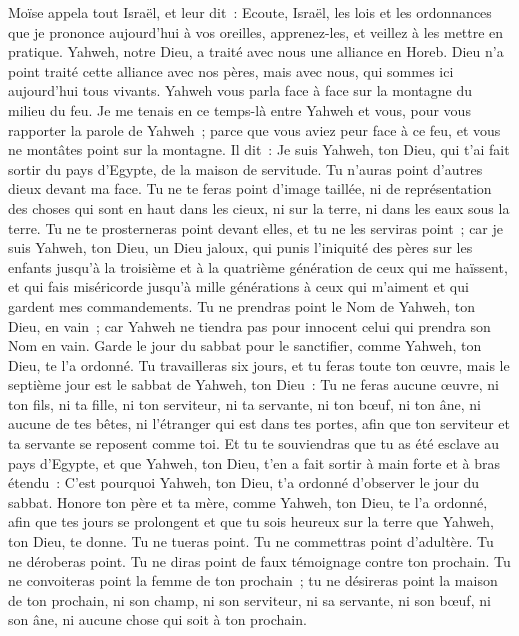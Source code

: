 \begin{multicols}{2}
\VerseOne{}Moïse appela tout Israël, et leur dit~: Ecoute, Israël, les lois et les ordonnances que je prononce aujourd'hui à vos oreilles, apprenez-les, et veillez à les mettre en pratique.
Yahweh, notre Dieu, a traité avec nous une alliance en Horeb.
Dieu n'a point traité cette alliance avec nos pères, mais avec nous, qui sommes ici aujourd'hui tous vivants.
Yahweh vous parla face à face sur la montagne du milieu du feu.
Je me tenais en ce temps-là entre Yahweh et vous, pour vous rapporter la parole de Yahweh~; parce que vous aviez peur face à ce feu, et vous ne montâtes point sur la montagne. Il dit~:
Je suis Yahweh, ton Dieu, qui t'ai fait sortir du pays d'Egypte, de la maison de servitude.
Tu n'auras point d'autres dieux devant ma face.
Tu ne te feras point d'image taillée, ni de représentation des choses qui sont en haut dans les cieux, ni sur la terre, ni dans les eaux sous la terre.
Tu ne te prosterneras point devant elles, et tu ne les serviras point~; car je suis Yahweh, ton Dieu, un Dieu jaloux, qui punis l'iniquité des pères sur les enfants jusqu'à la troisième et à la quatrième génération de ceux qui me haïssent,
et qui fais miséricorde jusqu'à mille générations à ceux qui m'aiment et qui gardent mes commandements.
Tu ne prendras point le Nom de Yahweh, ton Dieu, en vain~; car Yahweh ne tiendra pas pour innocent celui qui prendra son Nom en vain.
Garde le jour du sabbat pour le sanctifier, comme Yahweh, ton Dieu, te l'a ordonné.
Tu travailleras six jours, et tu feras toute ton œuvre,
mais le septième jour est le sabbat de Yahweh, ton Dieu~: Tu ne feras aucune œuvre, ni ton fils, ni ta fille, ni ton serviteur, ni ta servante, ni ton bœuf, ni ton âne, ni aucune de tes bêtes, ni l'étranger qui est dans tes portes, afin que ton serviteur et ta servante se reposent comme toi.
Et tu te souviendras que tu as été esclave au pays d'Egypte, et que Yahweh, ton Dieu, t'en a fait sortir à main forte et à bras étendu~: C'est pourquoi Yahweh, ton Dieu, t'a ordonné d'observer le jour du sabbat.
Honore ton père et ta mère, comme Yahweh, ton Dieu, te l'a ordonné, afin que tes jours se prolongent et que tu sois heureux sur la terre que Yahweh, ton Dieu, te donne.
Tu ne tueras point.
Tu ne commettras point d'adultère.
Tu ne déroberas point.
Tu ne diras point de faux témoignage contre ton prochain.
Tu ne convoiteras point la femme de ton prochain~; tu ne désireras point la maison de ton prochain, ni son champ, ni son serviteur, ni sa servante, ni son bœuf, ni son âne, ni aucune chose qui soit à ton prochain.

\end{multicols}
